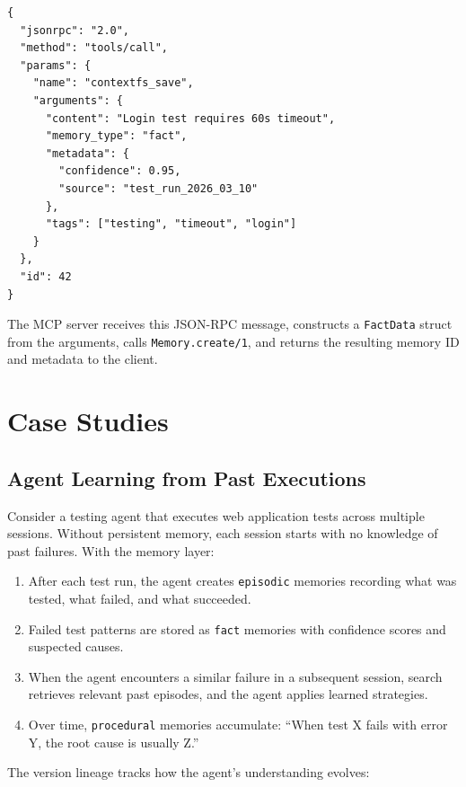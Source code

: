 \documentclass[12pt,a4paper]{article}
\theoremstyle{definition}
\begin{document}
\begin{lstlisting}[style=jsonstyle, caption={MCP tool call for saving a typed memory.}, label={lst:mcp-example}]
{
  "jsonrpc": "2.0",
  "method": "tools/call",
  "params": {
    "name": "contextfs_save",
    "arguments": {
      "content": "Login test requires 60s timeout",
      "memory_type": "fact",
      "metadata": {
        "confidence": 0.95,
        "source": "test_run_2026_03_10"
      },
      "tags": ["testing", "timeout", "login"]
    }
  },
  "id": 42
}
\end{lstlisting}

The MCP server receives this JSON-RPC message, constructs a \texttt{FactData} struct from the arguments, calls \texttt{Memory.create/1}, and returns the resulting memory ID and metadata to the client.

\section{Case Studies}\label{sec:case-studies}

\subsection{Agent Learning from Past Executions}\label{subsec:case-learning}

Consider a testing agent that executes web application tests across multiple sessions.
Without persistent memory, each session starts with no knowledge of past failures.
With the memory layer:

\begin{enumerate}
  \item After each test run, the agent creates \texttt{episodic} memories recording what was tested, what failed, and what succeeded.
  \item Failed test patterns are stored as \texttt{fact} memories with confidence scores and suspected causes.
  \item When the agent encounters a similar failure in a subsequent session, search retrieves relevant past episodes, and the agent applies learned strategies.
  \item Over time, \texttt{procedural} memories accumulate: ``When test X fails with error Y, the root cause is usually Z.''
\end{enumerate}

The version lineage tracks how the agent's understanding evolves:
\end{document}
